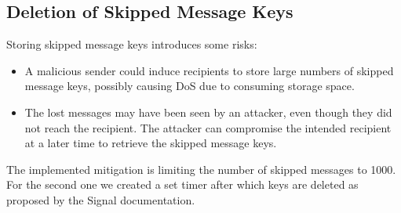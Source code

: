 \subsection{Deletion of Skipped Message Keys}
\label{subsec:DeletionofSkippedMessageKeys}

Storing skipped message keys introduces some risks:

\begin{itemize}
  \item A malicious sender could induce recipients to store large numbers of skipped message keys, possibly causing DoS due to consuming storage space.
  \item The lost messages may have been seen by an attacker, even though they did not reach the recipient. The attacker can compromise the intended recipient at a later time to retrieve the skipped message keys.
\end{itemize}

The implemented mitigation is limiting the number of skipped messages to 1000. For the second one we created a set timer after which keys are deleted as proposed by the Signal documentation.

